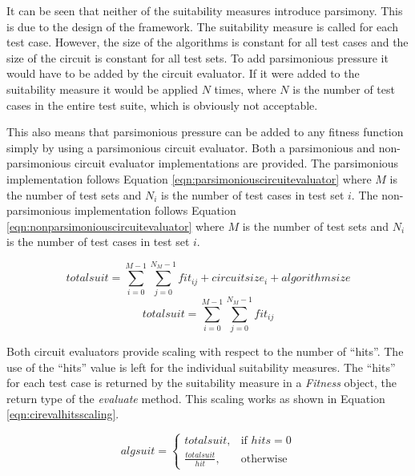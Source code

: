 It can be seen that neither of the suitability measures introduce parsimony.
This is due to the design of the framework.
The suitability measure is called for each test case.
However, the size of the algorithms is constant for all test cases and the size of the circuit is constant for all test sets.
To add parsimonious pressure it would have to be added by the circuit evaluator.
If it were added to the suitability measure it would be applied $N$ times, where $N$ is the number of test cases in the entire test suite, which is obviously not acceptable.

This also means that parsimonious pressure can be added to any fitness function simply by using a parsimonious circuit evaluator.
Both a parsimonious and non-parsimonious circuit evaluator implementations are provided.
The parsimonious implementation follows Equation \ref{eqn:parsimoniouscircuitevaluator} where $M$ is the number of test sets and $N_i$ is the number of test cases in test set $i$.
The non-parsimonious implementation follows Equation \ref{eqn:nonparsimoniouscircuitevaluator} where $M$ is the number of test sets and $N_i$ is the number of test cases in test set $i$.

\begin{equation}
 totalsuit = \sum_{i=0}^{M-1}\sum_{j=0}^{N_M-1}fit_{ij}+circuitsize_i+algorithmsize
\label{eqn:parsimoniouscircuitevaluator}
\end{equation}
\begin{equation}
 totalsuit = \sum_{i=0}^{M-1}\sum_{j=0}^{N_M-1}fit_{ij}
\label{eqn:nonparsimoniouscircuitevaluator}
\end{equation}

Both circuit evaluators provide scaling with respect to the number of ``hits''.
The use of the ``hits'' value is left for the individual suitability measures.
The ``hits'' for each test case is returned by the suitability measure in a \emph{Fitness} object, the return type of the \emph{evaluate} method.
This scaling works as shown in Equation \ref{eqn:cirevalhitsscaling}.

\begin{equation}
 algsuit = 
\left\{
  \begin{array}{cc} totalsuit, & \mbox{if } hits={0}\\ 
  \frac{totalsuit}{hit}, & \mbox{otherwise}\end{array}
\right.
\label{eqn:cirevalhitsscaling}
\end{equation}

